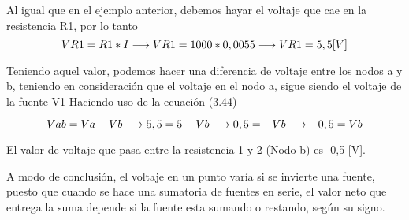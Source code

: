 \begin{example}
Al igual que en el ejemplo anterior, debemos hayar el voltaje que cae en la resistencia R1, por lo tanto 
\begin {equation*}
\notag
VR1=R1*I
\longrightarrow
VR1=1000*0,0055
\longrightarrow
VR1=5,5[V]
\end {equation*}

Teniendo aquel valor, podemos hacer una diferencia de voltaje entre los nodos a y b, teniendo en consideración que el voltaje en el nodo a, sigue siendo el voltaje de la fuente V1
\newpage
Haciendo uso de la ecuación (3.44)

\begin {equation*}
\notag
Vab=Va-Vb
\longrightarrow
5,5=5-Vb
\longrightarrow
0,5=-Vb
\longrightarrow
-0,5=Vb
\end {equation*}
 
El valor de voltaje que pasa entre la resistencia 1 y 2 (Nodo b) es -0,5 [V].

A modo de conclusión, el voltaje en un punto varía si se invierte una fuente, puesto que cuando se hace una sumatoria de fuentes en serie, el valor neto que entrega la suma depende si la fuente esta sumando o restando, según su signo.
\end{example}
\newpage


